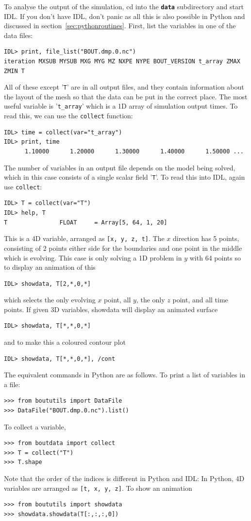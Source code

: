 \documentclass[12pt]{article}
\newcommand{\code}[1]{\texttt{#1}}
\newcommand{\file}[1]{\texttt{\bf #1}}
\begin{document}
To analyse the output of the simulation, cd into the \file{data} subdirectory and start IDL.
If you don't have IDL, don't panic as all this is also possible in Python and discussed
in section~\ref{sec:pythonroutines}. First, list the variables in one of the data files:
\begin{verbatim}
IDL> print, file_list("BOUT.dmp.0.nc")
iteration MXSUB MYSUB MXG MYG MZ NXPE NYPE BOUT_VERSION t_array ZMAX ZMIN T
\end{verbatim}
All of these except '\code{T}' are in all output files, and they contain information about
the layout of the mesh so that the data can be put in the correct place. The most useful variable
is '\code{t\_array}' which is a 1D array of simulation output times. To read this, we can
use the \code{collect} function:
\begin{verbatim}
IDL> time = collect(var="t_array")
IDL> print, time
      1.10000      1.20000      1.30000      1.40000      1.50000 ...
\end{verbatim}
The number of variables in an output file depends on the model being solved, which in this
case consists of a single scalar field '\code{T}'. To read this into IDL, again use \code{collect}:
\begin{verbatim}
IDL> T = collect(var="T")
IDL> help, T
T               FLOAT     = Array[5, 64, 1, 20]
\end{verbatim}
This is a 4D variable, arranged as \code{[x, y, z, t]}. The $x$ direction has 5 points, consisting
of 2 points either side for the boundaries and one point in the middle which is evolving. This case
is only solving a 1D problem in $y$ with 64 points so to display an animation of this
\begin{verbatim}
IDL> showdata, T[2,*,0,*]
\end{verbatim}
which selects the only evolving $x$ point, all $y$, the only $z$ point, and all time points.
If given 3D variables, showdata will display an animated surface 
\begin{verbatim}
IDL> showdata, T[*,*,0,*]
\end{verbatim}
and to make this a coloured contour plot 
\begin{verbatim}
IDL> showdata, T[*,*,0,*], /cont
\end{verbatim}

The equivalent commands in Python are as follows. To print a list of variables
in a file:
\begin{verbatim}
>>> from boututils import DataFile
>>> DataFile("BOUT.dmp.0.nc").list()
\end{verbatim}
To collect a variable,
\begin{verbatim}
>>> from boutdata import collect
>>> T = collect("T")
>>> T.shape
\end{verbatim}
Note that the order of the indices is different in Python and IDL: In Python,
4D variables are arranged as \code{[t, x, y, z]}.
To show an animation
\begin{verbatim}
>>> from boututils import showdata
>>> showdata.showdata(T[:,:,:,0])
\end{verbatim}
\end{document}

